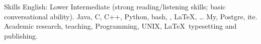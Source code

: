 
\begin{rubric}{Skills}
\entry*[Languages]
	English: Lower Intermediate (strong reading/listening skills; basic conversational ability).
	Java, C, C++, Python, bash, , \LaTeX, \ldots
\entry*[Databases]
	My, Postgre, ite.
\entry*[Misc.]
	Academic research, teaching, Programming, UNIX, \LaTeX\ typesetting and publishing.
\end{rubric}
